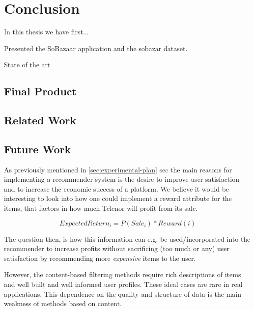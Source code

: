 
\chapter{Conclusion}
\minitoc

In this thesis we have first...

Presented the SoBazaar application and the sobazar dataset.

State of the art 


\clearpage

\section{Final Product}


\section{Related Work}


\section{Future Work}



As previously mentioned in \ref{sec:experimental-plan} sec the main reasons for implementing a recommender
system is the desire to improve user satisfaction and to increase the economic success of a platform.
We believe it would be interesting to look into how one could implement a reward attribute for the
items, that factors in how much Telenor will profit from its sale.

\begin{equation}
ExpectedReturn_i = P(Sale_i) * Reward(i)
\end{equation}

The question then, is how this information can e.g. be used/incorporated into the recommender to
increase profits without sacrificing (too much or any) user satisfaction by recommending
more \emph{expensive} items to the user.


However, the content-based filtering methods require rich descriptions of items and well built 
and well informed user profiles. These ideal cases are rare in real applications. This dependence 
on the quality and structure of data is the main weakness of methods based on content.



